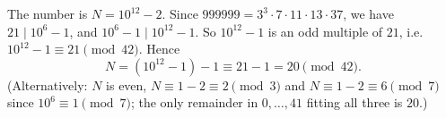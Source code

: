 The number is $N=10^{12}-2$. Since $999999=3^3\cdot7\cdot11\cdot13\cdot37$, we have $21\mid10^6-1$, and $10^6-1\mid10^{12}-1$. So $10^{12}-1$ is an odd multiple of $21$, i.e. $10^{12}-1\equiv21\pmod{42}$. Hence
\[N=\left(10^{12}-1\right)-1\equiv21-1=\boxed{20}\pmod{42}.\]
(Alternatively: $N$ is even, $N\equiv1-2\equiv2\pmod3$ and $N\equiv1-2\equiv6\pmod7$ since $10^6\equiv1\pmod7$; the only remainder in $0,\dots,41$ fitting all three is $20$.)
